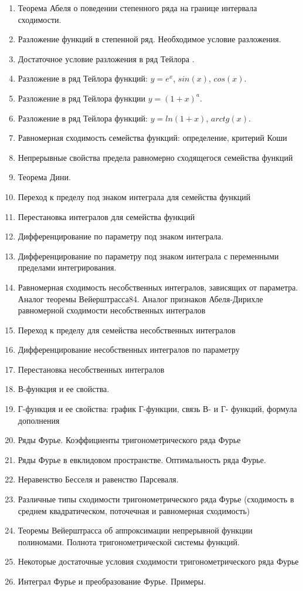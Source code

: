 \documentclass{article}
\begin{document}
\begin{enumerate}
    \item Теорема Абеля о поведении степенного ряда на границе интервала
          сходимости.
    \item Разложение функций в степенной ряд. Необходимое условие
          разложения.
    \item Достаточное условие разложения в ряд Тейлора .
    \item Разложение в ряд Тейлора функций: $y=e^x$, $sin(x)$, $cos(x)$.
    \item Разложение в ряд Тейлора функции $y=(1+x)^a$.
    \item Разложение в ряд Тейлора функций: $y=ln(1+x)$, $arctg(x)$.
    \item Равномерная сходимость семейства функций: определение,
          критерий Коши
    \item Непрерывные свойства предела равномерно сходящегося
          семейства функций
    \item Теорема Дини.
    \item Переход к пределу под знаком интеграла для семейства функций
    \item Перестановка интегралов для семейства функций
    \item Дифференцирование по параметру под знаком интеграла.
    \item Дифференцирование по параметру под знаком интеграла с
          переменными пределами интегрирования.
    \item Равномерная сходимость несобственных интегралов, зависящих от
          параметра. Аналог теоремы Вейерштрасса84. Аналог признаков Абеля-Дирихле равномерной сходимости
          несобственных интегралов
    \item Переход к пределу для семейства несобственных интегралов
    \item Дифференцирование несобственных интегралов по параметру
    \item Перестановка несобственных интегралов
    \item В-функция и ее свойства.
    \item Г-функция и ее свойства: график Г-функции, связь В- и Г-
          функций, формула дополнения
    \item Ряды Фурье. Коэффициенты тригонометрического ряда Фурье
    \item Ряды Фурье в евклидовом пространстве. Оптимальность ряда
          Фурье.
    \item Неравенство Бесселя и равенство Парсеваля.
    \item Различные типы сходимости тригонометрического ряда Фурье
          (сходимость в среднем квадратическом, поточечная и равномерная
          сходимость)
    \item Теоремы Вейерштрасса об аппроксимации непрерывной функции
          полиномами. Полнота тригонометрической системы функций.
    \item Некоторые достаточные условия сходимости тригонометрического
          ряда Фурье
    \item Интеграл Фурье и преобразование Фурье. Примеры.
\end{enumerate}
\end{document}
